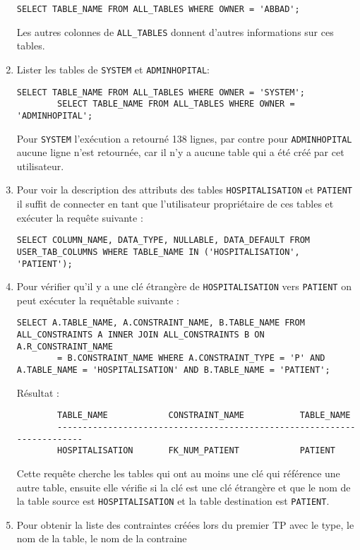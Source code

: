 \documentclass[12pt,a4paper]{article}
\begin{document}
\begin{enumerate}
	\begin{lstlisting}[style=OracleSQL]
		SELECT TABLE_NAME FROM ALL_TABLES WHERE OWNER = 'ABBAD';
	\end{lstlisting}
	Les autres colonnes de \texttt{ALL\_TABLES} donnent d'autres informations sur ces tables.
	\item Lister les tables de \texttt{SYSTEM} et \texttt{ADMINHOPITAL}:
	\begin{lstlisting}[style=OracleSQL]
		SELECT TABLE_NAME FROM ALL_TABLES WHERE OWNER = 'SYSTEM';
		SELECT TABLE_NAME FROM ALL_TABLES WHERE OWNER = 'ADMINHOPITAL';
	\end{lstlisting}
	Pour \texttt{SYSTEM} l'exécution a retourné 138 lignes, par contre pour \texttt{ADMINHOPITAL} aucune ligne n'est retournée, car
	il n'y a aucune table qui a été créé par cet utilisateur.
	\item Pour voir la description des attributs des tables \texttt{HOSPITALISATION} et \texttt{PATIENT} il suffit de connecter en tant
	que l'utilisateur propriétaire de ces tables et exécuter la requête suivante :
	\begin{lstlisting}[style=OracleSQL]
		SELECT COLUMN_NAME, DATA_TYPE, NULLABLE, DATA_DEFAULT FROM USER_TAB_COLUMNS WHERE TABLE_NAME IN ('HOSPITALISATION', 'PATIENT');
	\end{lstlisting}
	\item Pour vérifier qu'il y a une clé étrangère de \texttt{HOSPITALISATION} vers \texttt{PATIENT} on peut exécuter la requêtable
	suivante :
	\begin{lstlisting}[style=OracleSQL]
		SELECT A.TABLE_NAME, A.CONSTRAINT_NAME, B.TABLE_NAME FROM ALL_CONSTRAINTS A INNER JOIN ALL_CONSTRAINTS B ON A.R_CONSTRAINT_NAME
		= B.CONSTRAINT_NAME WHERE A.CONSTRAINT_TYPE = 'P' AND A.TABLE_NAME = 'HOSPITALISATION' AND B.TABLE_NAME = 'PATIENT';
	\end{lstlisting}
	Résultat :
	\begin{verbatim}
		TABLE_NAME            CONSTRAINT_NAME           TABLE_NAME
		------------------------------------------------------------------------
		HOSPITALISATION       FK_NUM_PATIENT            PATIENT
	\end{verbatim}
	Cette requête cherche les tables qui ont au moins une clé qui référence une autre table, ensuite elle vérifie si la clé est une
	clé étrangère et que le nom de la table source est \texttt{HOSPITALISATION} et la table destination est \texttt{PATIENT}.
	\item Pour obtenir la liste des contraintes créées lors du premier TP avec le type, le nom de la table, le nom de la contraine

\end{enumerate}
\end{document}
